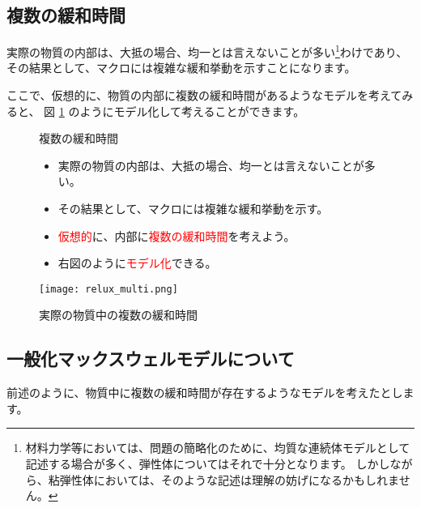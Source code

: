 \documentclass[uplatex,dvipdfmx,a4paper,11pt]{jsreport}
\begin{document}
\subsection{複数の緩和時間}
実際の物質の内部は、大抵の場合、均一とは言えないことが多い\footnote{
	材料力学等においては、問題の簡略化のために、均質な連続体モデルとして記述する場合が多く、弾性体についてはそれで十分となります。
	しかしながら、粘弾性体においては、そのような記述は理解の妨げになるかもしれません。
}わけであり、その結果として、マクロには複雑な緩和挙動を示すことになります。

ここで、仮想的に、物質の内部に複数の緩和時間があるようなモデルを考えてみると、
図 \ref{fig:relux_multi} のようにモデル化して考えることができます。

\begin{figure}[htb]
	\begin{center}
		\begin{minipage}{0.45\textwidth}
			\begin{itembox}[l]{複数の緩和時間}
				\begin{itemize}
					\item 実際の物質の内部は、大抵の場合、均一とは言えないことが多い。
					\item その結果として、マクロには複雑な緩和挙動を示す。
					\item \textcolor{red}{仮想的}に、内部に\textcolor{red}{複数の緩和時間}を考えよう。
					\item 右図のように\textcolor{red}{モデル化}できる。
				\end{itemize}
			\end{itembox}
		\end{minipage}
		\begin{minipage}{0.45\textwidth}
			\begin{center}
			\texttt{[image: relux\_multi.png]}
			\end{center}
		\end{minipage}
		\caption{実際の物質中の複数の緩和時間}
		\label{fig:relux_multi}
	\end{center}
\end{figure}

\subsection{一般化マックスウェルモデルについて}
前述のように、物質中に複数の緩和時間が存在するようなモデルを考えたとします。
\end{document}
